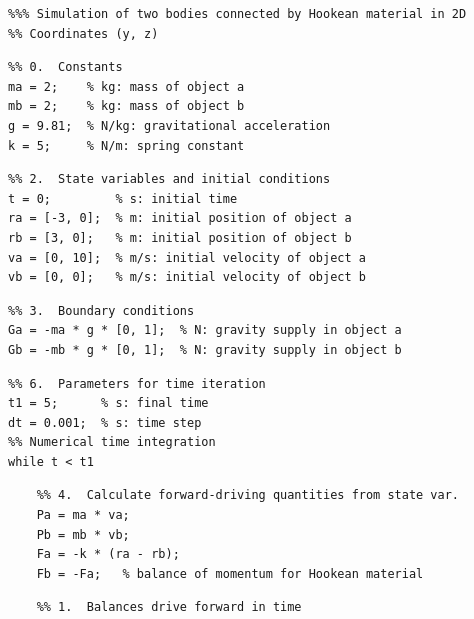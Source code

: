 \documentclass[a4paper,12pt,%
onecolumn,oneside,%
british%
]{memoir}
\newcommand*{\amp}{\&}
\renewcommand*{\|}[1][]{\nonscript\:#1\vert\nonscript\:\mathopen{}}
\begin{document}
\begin{table}[p]
  \caption{Example script for numerical time integration of spring\,\amp\,bodies system.}\label{tab:script_strategy}

\small
\begin{framed}\vspace{-1\baselineskip}
\color{grey}\begin{verbatim}
%%% Simulation of two bodies connected by Hookean material in 2D
%% Coordinates (y, z)
\end{verbatim}
\vspace{-1.25\baselineskip}
\color{yellow}\begin{verbatim}
%% 0.  Constants
ma = 2;    % kg: mass of object a
mb = 2;    % kg: mass of object b
g = 9.81;  % N/kg: gravitational acceleration
k = 5;     % N/m: spring constant
\end{verbatim}
\vspace{-1.25\baselineskip}
\color{red}\begin{verbatim}
%% 2.  State variables and initial conditions
t = 0;         % s: initial time
ra = [-3, 0];  % m: initial position of object a
rb = [3, 0];   % m: initial position of object b
va = [0, 10];  % m/s: initial velocity of object a
vb = [0, 0];   % m/s: initial velocity of object b
\end{verbatim}
\vspace{-1.25\baselineskip}
\color{purple}\begin{verbatim}
%% 3.  Boundary conditions
Ga = -ma * g * [0, 1];  % N: gravity supply in object a
Gb = -mb * g * [0, 1];  % N: gravity supply in object b
\end{verbatim}
\vspace{-1.25\baselineskip}
\color{midgrey}\begin{verbatim}
%% 6.  Parameters for time iteration
t1 = 5;      % s: final time
dt = 0.001;  % s: time step
%% Numerical time integration
while t < t1
\end{verbatim}
\vspace{-1.25\baselineskip}
\color{blue}\begin{verbatim}
    %% 4.  Calculate forward-driving quantities from state var.
    Pa = ma * va;
    Pb = mb * vb;
    Fa = -k * (ra - rb);
    Fb = -Fa;   % balance of momentum for Hookean material
\end{verbatim}
\vspace{-1.25\baselineskip}
\color{green}\begin{verbatim}
    %% 1.  Balances drive forward in time

\end{verbatim}
\end{framed}
\end{table}
\end{document}
